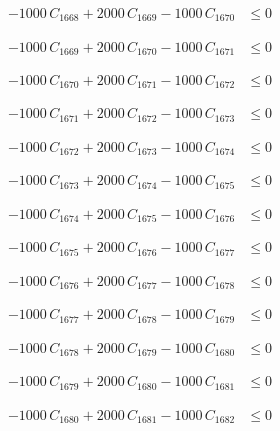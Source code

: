 \documentclass[a4paper,11pt]{article}
\begin{document}
\begin{align}
-1000\,C_{1668} + 2000\,C_{1669} - 1000\,C_{1670} &\leq 0 \nonumber
\end{align}

\begin{align}
-1000\,C_{1669} + 2000\,C_{1670} - 1000\,C_{1671} &\leq 0 \nonumber
\end{align}

\begin{align}
-1000\,C_{1670} + 2000\,C_{1671} - 1000\,C_{1672} &\leq 0 \nonumber
\end{align}

\begin{align}
-1000\,C_{1671} + 2000\,C_{1672} - 1000\,C_{1673} &\leq 0 \nonumber
\end{align}

\begin{align}
-1000\,C_{1672} + 2000\,C_{1673} - 1000\,C_{1674} &\leq 0 \nonumber
\end{align}

\begin{align}
-1000\,C_{1673} + 2000\,C_{1674} - 1000\,C_{1675} &\leq 0 \nonumber
\end{align}

\begin{align}
-1000\,C_{1674} + 2000\,C_{1675} - 1000\,C_{1676} &\leq 0 \nonumber
\end{align}

\begin{align}
-1000\,C_{1675} + 2000\,C_{1676} - 1000\,C_{1677} &\leq 0 \nonumber
\end{align}

\begin{align}
-1000\,C_{1676} + 2000\,C_{1677} - 1000\,C_{1678} &\leq 0 \nonumber
\end{align}

\begin{align}
-1000\,C_{1677} + 2000\,C_{1678} - 1000\,C_{1679} &\leq 0 \nonumber
\end{align}

\begin{align}
-1000\,C_{1678} + 2000\,C_{1679} - 1000\,C_{1680} &\leq 0 \nonumber
\end{align}

\begin{align}
-1000\,C_{1679} + 2000\,C_{1680} - 1000\,C_{1681} &\leq 0 \nonumber
\end{align}

\begin{align}
-1000\,C_{1680} + 2000\,C_{1681} - 1000\,C_{1682} &\leq 0 \nonumber
\end{align}
\end{document}
